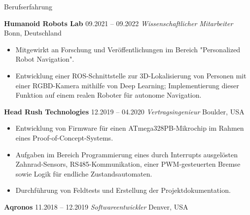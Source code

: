 \begin{rubric}{Berufserfahrung}

%
%
\entry*[] \textbf{Humanoid Robots Lab} \hfill 09.2021 -- 09.2022 \newline  
 \emph{Wissenschaftlicher Mitarbeiter} \hfill Bonn, Deutschland \newline  
\vspace{\CVItemizeHeaderSpacing} \begin{itemize}[leftmargin=*, rightmargin=1cm]
	\setlength{\itemsep}{\CVItemizeSpacing}  
	\item Mitgewirkt an Forschung und Veröffentlichungen im Bereich "Personalized Robot Navigation".  
	\item Entwicklung einer ROS-Schnittstelle zur 3D-Lokalisierung von Personen mit einer RGBD-Kamera mithilfe von Deep Learning; Implementierung dieser Funktion auf einem realen Roboter für autonome Navigation. 
\end{itemize}
%
%
\entry*[] \textbf{Head Rush Technologies} \hfill 12.2019 -- 04.2020 \newline  
 \emph{Vertragsingenieur} \hfill Boulder, USA \newline  
\vspace{\CVItemizeHeaderSpacing} \begin{itemize}[leftmargin=*, rightmargin=1cm]
	\setlength{\itemsep}{\CVItemizeSpacing}  
	\item Entwicklung von Firmware für einen ATmega328PB-Mikrochip im Rahmen eines Proof-of-Concept-Systems.
	\item Aufgaben im Bereich Programmierung eines durch Interrupts ausgelösten Zahnrad-Sensors, RS485-Kommunikation, einer PWM-gesteuerten Bremse sowie Logik für endliche Zustandsautomaten.  
	\item Durchführung von Feldtests und Erstellung der Projektdokumentation.  
\end{itemize}
%
%
\entry*[] \textbf{Aqronos} \hfill 11.2018 -- 12.2019 \newline  
\emph{Softwareentwickler} \hfill Denver, USA \newline  

\end{rubric}
